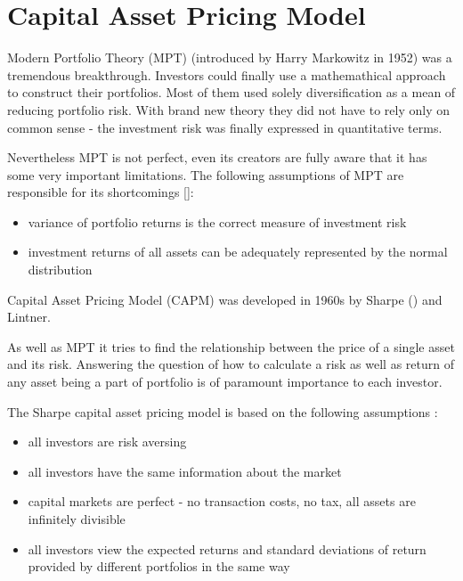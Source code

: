 
\section{Capital Asset Pricing Model}
\label{CAPM}


Modern Portfolio Theory (MPT) (introduced by Harry Markowitz in 1952) was a tremendous breakthrough. 
Investors could finally use a mathemathical approach to construct their portfolios.
Most of them used solely diversification as a mean of reducing portfolio risk.
With brand new theory they did not have to rely only on common sense - the investment risk was finally expressed in quantitative terms. 

Nevertheless MPT is not perfect, even its creators are fully aware that it has some very important limitations.
The following assumptions of MPT are responsible for its shortcomings [\cite{MPT}]:
\begin{itemize}
  \item variance of portfolio returns is the correct measure of investment risk
  \item investment returns of all assets can be adequately represented by the normal distribution
\end{itemize}

  

Capital Asset Pricing Model (CAPM) was developed in 1960s by Sharpe (\cite{CAPM-Sharpe}) and Lintner.
 
As well as MPT it tries to find the relationship between the price of a single asset and its risk.
Answering the question of how to calculate a risk as well as return of any asset being a part of portfolio is of paramount importance to each investor.

The Sharpe capital asset pricing model is based on the following assumptions \cite{CAPM}:

\begin{itemize}
  \item all investors are risk aversing
  \item all investors have the same information about the market
  \item capital markets are perfect - no transaction costs, no tax, all assets are infinitely divisible
  \item all investors view the expected returns and standard deviations of return provided by different portfolios in the same way
\end{itemize}
 
